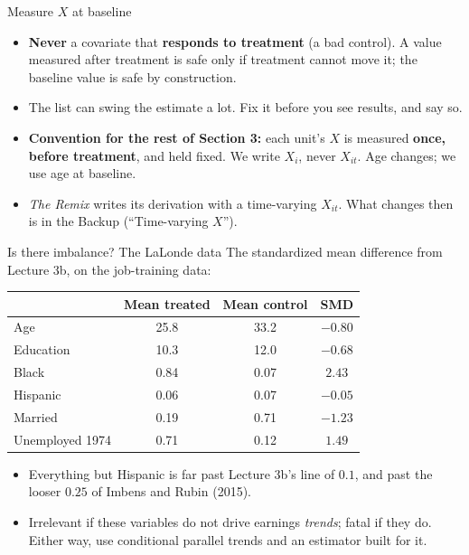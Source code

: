\documentclass[
  11pt,
  ignorenonframetext,
  aspectratio=169,
]{beamer}
\providecommand{\tightlist}{%
  \setlength{\itemsep}{0pt}\setlength{\parskip}{0pt}}
\begin{document}
\begin{frame}{Measure \(X\) at baseline}
\protect{}\label{measure-x-at-baseline}
\begin{itemize}
\tightlist
\item
  \textbf{Never} a covariate that \textbf{responds to treatment} (a bad
  control). A value measured after treatment is safe only if treatment
  cannot move it; the baseline value is safe by construction.
\item
  The list can swing the estimate a lot. Fix it before you see results,
  and say so.
\end{itemize}

\vspace{0.4em}

\begin{itemize}
\tightlist
\item
  \textbf{Convention for the rest of Section 3:} each unit's \(X\) is
  measured \textbf{once, before treatment}, and held fixed. We write
  \(X_i\), never \(X_{it}\). Age changes; we use age at baseline.
\item
  \emph{The Remix} writes its derivation with a time-varying \(X_{it}\).
  What changes then is in the Backup (``Time-varying \(X\)'').
\end{itemize}
\end{frame}

\begin{frame}{Is there imbalance? The LaLonde data}
\protect{}\label{is-there-imbalance-the-lalonde-data}
The standardized mean difference from Lecture 3b, on the job-training
data:

\begin{center}\small
\begin{tabular}{lccc}
\toprule
 & Mean treated & Mean control & SMD \\
\midrule
Age & 25.8 & 33.2 & $-0.80$ \\
Education & 10.3 & 12.0 & $-0.68$ \\
Black & 0.84 & 0.07 & $2.43$ \\
Hispanic & 0.06 & 0.07 & $-0.05$ \\
Married & 0.19 & 0.71 & $-1.23$ \\
Unemployed 1974 & 0.71 & 0.12 & $1.49$ \\
\bottomrule
\end{tabular}
\end{center}

\begin{itemize}
\tightlist
\item
  Everything but Hispanic is far past Lecture 3b's line of \(0.1\), and
  past the looser \(0.25\) of Imbens and Rubin (2015).
\item
  Irrelevant if these variables do not drive earnings \emph{trends};
  fatal if they do. Either way, use conditional parallel trends and an
  estimator built for it.
\end{itemize}
\end{frame}
\end{document}
